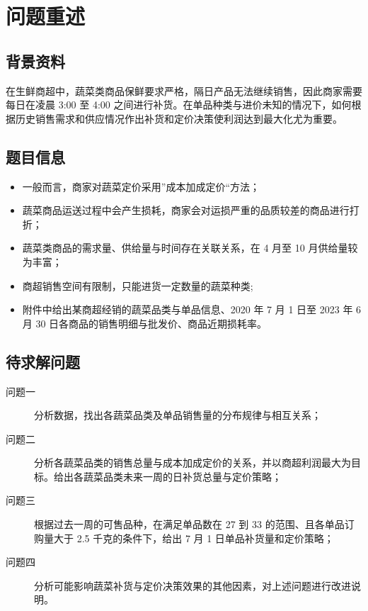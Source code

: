 \documentclass[withoutpreface,bwprint]{cumcmthesis} %
\begin{document}
\tableofcontents


\section{问题重述}

\subsection{背景资料}

在生鲜商超中，蔬菜类商品保鲜要求严格，隔日产品无法继续销售，因此商家需要每日在凌晨 3:00 至 4:00 之间进行补货。在单品种类与进价未知的情况下，如何根据历史销售需求和供应情况作出补货和定价决策使利润达到最大化尤为重要。

\subsection{题目信息}

\begin{itemize}
	\item 一般而言，商家对蔬菜定价采用”成本加成定价“方法；
	\item 蔬菜商品运送过程中会产生损耗，商家会对运损严重的品质较差的商品进行打折；
	\item 蔬菜类商品的需求量、供给量与时间存在关联关系，在 4 月至 10 月供给量较为丰富；
	\item 商超销售空间有限制，只能进货一定数量的蔬菜种类;
	\item 附件中给出某商超经销的蔬菜品类与单品信息、2020 年 7 月 1 日至 2023 年 6 月 30
	日各商品的销售明细与批发价、商品近期损耗率。
\end{itemize}


\subsection{待求解问题}

\begin{description}
    \item[问题一] 分析数据，找出各蔬菜品类及单品销售量的分布规律与相互关系；
    \item[问题二] 分析各蔬菜品类的销售总量与成本加成定价的关系，并以商超利润最大为目标。给出各蔬菜品类未来一周的日补货总量与定价策略；
    \item[问题三] 根据过去一周的可售品种，在满足单品数在 27 到 33 的范围、且各单品订购量大于 2.5 千克的条件下，给出 7 月 1 日单品补货量和定价策略；
    \item[问题四] 分析可能影响蔬菜补货与定价决策效果的其他因素，对上述问题进行改进说明。
\end{description}
\end{document}
